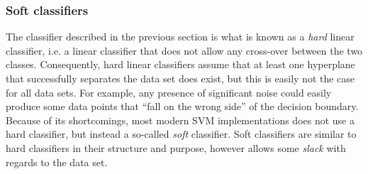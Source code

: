 \documentclass[nofootinbib,reprint,english]{revtex4-1}
\begin{document}
\subsubsection{Soft classifiers}
The classifier described in the previous section is what is known as a \emph{hard} linear classifier, i.e. a linear classifier that does not allow any cross-over between the two classes. Consequently, hard linear classifiers assume that at least one hyperplane that successfully separates the data set does exist, but this is easily not the case for all data sets. For example, any presence of significant noise could easily produce some data points that ``fall on the wrong side'' of the decision boundary. Because of its shortcomings, most modern SVM implementations does not use a hard classifier, but instead a so-called \emph{soft} classifier. Soft classifiers are similar to hard classifiers in their structure and purpose, however allows some \emph{slack} with regards to the data set.
\end{document}
